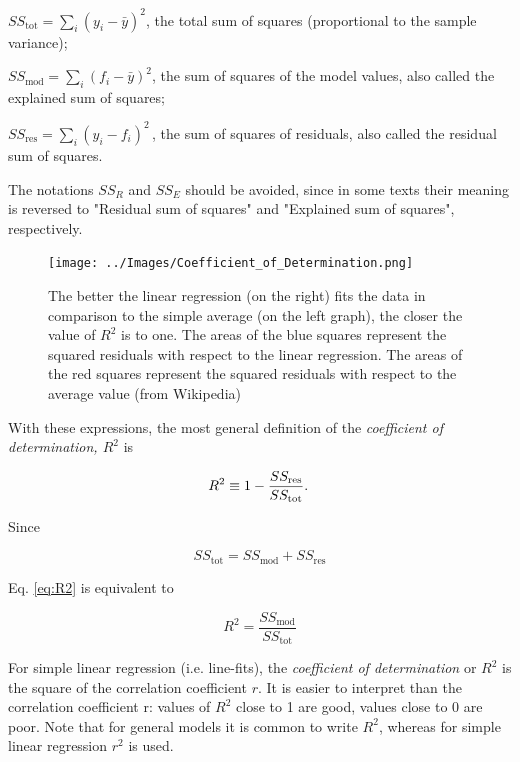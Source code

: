     $SS_\text{tot}=\sum_i (y_i-\bar{y})^2$, the total sum of squares (proportional to the sample variance);

    $SS_\text{mod}=\sum_i (f_i -\bar{y})^2$, the sum of squares of the model values, also called the explained sum of squares;

    $SS_\text{res}=\sum_i (y_i - f_i)^2\,$, the sum of squares of residuals, also called the residual sum of squares.

\vspace{5 mm}

The notations $SS_{R}$ and $SS_{E}$ should be avoided, since in some texts their meaning is reversed to "Residual sum of squares" and "Explained sum of squares", respectively.

\begin{figure}
  \centering
  \texttt{[image: ../Images/Coefficient\_of\_Determination.png]}\\
  \caption{The better the linear regression (on the right) fits the data in comparison to the simple average (on the left graph), the closer the value of $R^2$ is to one. The areas of the blue squares represent the squared residuals with respect to the linear regression. The areas of the red squares represent the squared residuals with respect to the average value (from Wikipedia)}\label{fig:CoefDetermination}
\end{figure}

\vspace{5 mm}

With these expressions, the most general definition of the \emph{coefficient of determination, $R^2$} is

\begin{equation}\label{eq:R2}
  R^2 \equiv 1 - {SS_{\rm res}\over SS_{\rm tot}}.\,
\end{equation}

Since

\begin{equation}
  SS_\text{tot} = SS_\text{mod} + SS_\text{res}
\end{equation}

Eq. \ref{eq:R2} is equivalent to

\begin{equation}
  R^2 = \frac{SS_\text{mod}}{SS_\text{tot}}
\end{equation}

For simple linear regression (i.e. line-fits), the \emph{coefficient of determination}  or $R^2$ is the square of the correlation coefficient $r$. It is easier to interpret than the correlation coefficient r: values of $R^2$ close to 1 are good, values close to 0 are poor.
Note that for general models it is common to write $R^2$, whereas for simple linear regression $r^2$ is used.

